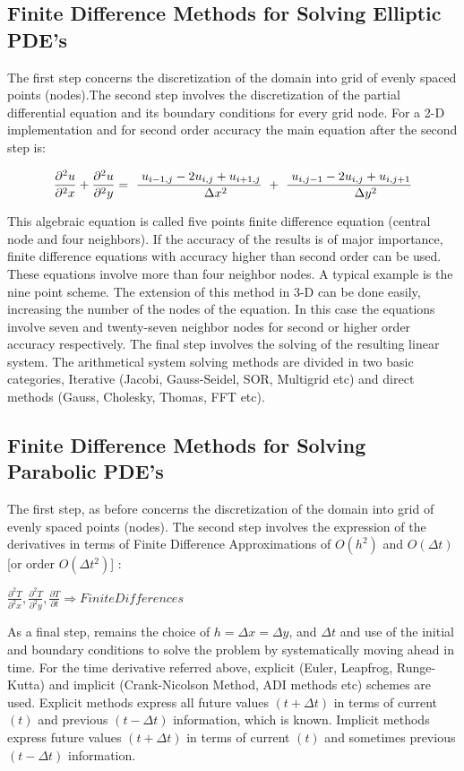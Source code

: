\subsection{Finite Difference Methods for Solving Elliptic PDE's}
The first step concerns the discretization of the domain into grid of evenly spaced points (nodes).The second step involves the discretization of the partial differential equation and its boundary conditions for every grid node. For a 2-D implementation and for second order accuracy the main equation after the second step is:


\[ \frac{\partial^2 u}{\partial^2 x} + \frac{\partial^2 u}{\partial^2 y}
   = \ \frac{\ u_{i-1,j} -2u_{i,j} + u_{i+1,j} }{\\\Delta x^2}\ + \ \frac{\ u_{i,j-1} -2u_{i,j} + u_{i,j+1} }{\\\Delta y^2}\]
      

This algebraic equation is called five points finite difference equation (central node and four neighbors). If the accuracy of the results is of major importance, finite difference equations with accuracy higher than second order can be used. These equations involve more than four neighbor nodes. A typical example is the nine point scheme. The extension of this method in 3-D can be done easily, increasing the number of the nodes of the equation. In this case the equations involve seven and twenty-seven neighbor nodes for second or higher order accuracy respectively. The final step involves the solving of the resulting linear system. The arithmetical system solving methods are divided in two basic categories, Iterative (Jacobi, Gauss-Seidel, SOR, Multigrid etc) and direct methods (Gauss, Cholesky, Thomas, FFT etc).

\subsection{Finite Difference Methods for Solving Parabolic PDE's}
The first step, as before concerns the discretization of the domain into grid of evenly spaced points (nodes). The second step involves the expression of the derivatives in terms of Finite Difference Approximations of $O(h^2)$ and $O(Δt)$ [or order $O(Δt^2)$] :

$\frac{\partial^2 T}{\partial^2 x} , \frac{\partial^2 T}{\partial^2 y} , \frac{\partial T}{\partial t}  \Longrightarrow Finite   Differences $

As a final step, remains the choice of $h = Δx = Δy$, and $Δt$ and use of the initial and boundary conditions to solve the problem by systematically moving ahead in time. For the time derivative referred above, explicit (Euler, Leapfrog, Runge-Kutta) and implicit (Crank-Nicolson Method, ADI methods etc) schemes are used. Explicit methods express all future values $(t + Δt)$ in terms of current $(t)$ and previous $(t - Δt)$ information, which is known. Implicit methods express future values $(t + Δt)$ in terms of current $(t)$ and sometimes previous $(t - Δt)$ information.

